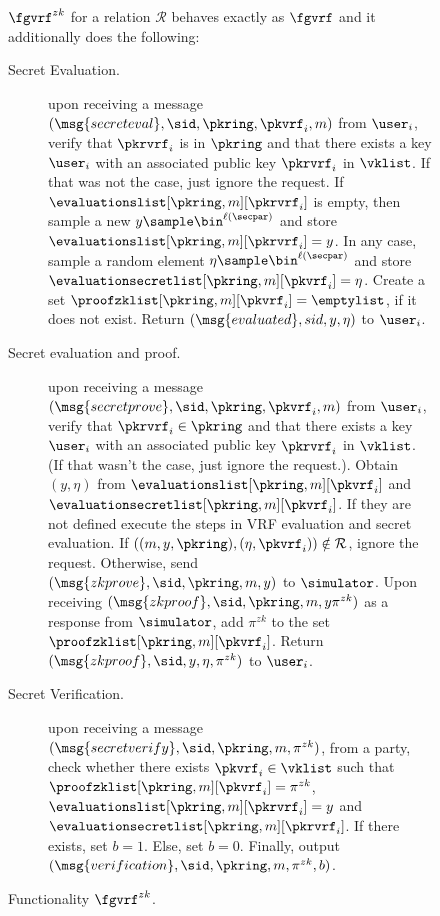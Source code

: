 \begin{figure}
	\scriptsize
	\begin{tcolorbox}
	{
			 $ \fgvrf^{zk} $ for a relation $ \mathcal{R} $ behaves exactly as $ \fgvrf $ and  it additionally does the following:
			\begin{description}
				\item[Secret Evaluation.] upon receiving a message $(\msg{secreteval}, \sid, \pkring,\pkvrf_i, m)$ from $\user_i$, verify that $\pkrvrf_i$ is in $ \pkring $ and that there exists a key $\user_i$ with an associated public key $\pkrvrf_i$ in $\vklist$. If that was not the case, just ignore the request.
				If $\evaluationslist[\pkring, m][\pkrvrf_i]$ is empty, then sample a new $y \sample \bin^{\ell(\secpar)}$ and  store $\evaluationslist[\pkring, m][\pkrvrf_i] = y$. In any case, sample a random element $ \eta  \sample \bin^{\ell(\secpar)} $ and store $ \evaluationsecretlist[\pkring, m][\pkvrf_i] = \eta $. Create a set $ \proofzklist[\pkring,m][\pkvrf_i] = \emptylist $, if it does not exist. Return $(\msg{evaluated}, sid, y, \eta)$ to $ \user_i $.
				
				\item[Secret evaluation and proof.] upon receiving a message $(\msg{secretprove}, \sid, \pkring, \pkvrf_i, m)$ from $\user_i$, verify that $\pkrvrf_i \in \pkring $ and  that there exists a key $ \user_i $ with an associated public key $ \pkrvrf_i $ in $ \vklist $. (If that wasn't the case, just ignore the request.). Obtain $ (y, \eta) $ from $\evaluationslist[\pkring, m][\pkvrf_i]$ and $\evaluationsecretlist[\pkring, m][\pkvrf_i]$. If they are not defined execute the steps in VRF evaluation and secret evaluation.
				If $ ((m, y, \pkring),(\eta,\pkvrf_i)) \notin \mathcal{R} $, ignore the request.  Otherwise, send $(\msg{zkprove}, \sid, \pkring, m, y)$ to $\simulator$. Upon receiving $(\msg{zkproof}, \sid, \pkring, m, y \pi^{zk})$ as a response from $\simulator$,  add $ \pi^{zk} $ to  the set $\proofzklist[\pkring, m][\pkvrf_i]$. Return $(\msg{zkproof}, \sid, y, \eta, \pi^{zk})$ to $\user_i$.
				
				
				\item[Secret Verification.] upon receiving a message $(\msg{secretverify}, \sid, \pkring, m, \pi^{zk})$, from a party, check whether there exists  $ \pkvrf_i \in \vklist $ such that $ \proofzklist[\pkring,m][\pkvrf_i] = \pi^{zk} $, $ \evaluationslist[\pkring,m][\pkrvrf_i] = y $ and $ \evaluationsecretlist[\pkring,m][\pkrvrf_i] $. If there exists, set $b = 1$. Else, set $b =0$. Finally, output $(\msg{verification}, \sid, \pkring, m, \pi^{zk}, b)$.
			\end{description}
		}
	\end{tcolorbox}
	\caption{Functionality  $ \fgvrf^{zk} $.\label{f:gvrfzk}}
\end{figure}
